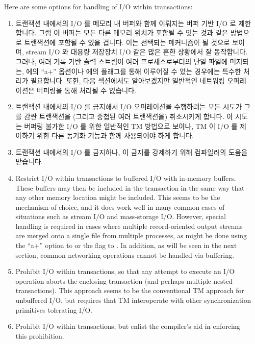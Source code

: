 Here are some options for handling of I/O within transactions:

\fi

\begin{enumerate}
\item	트랜잭션 내에서의 I/O 를 메모리 내 버퍼와 함께 이뤄지는 버퍼 기반 I/O
	로 제한합니다.
	그럼 이 버퍼는 모든 다른 메모리 위치가 포함될 수 잇는 것과 같은
	방법으로 트랜잭션에 포함될 수 있을 겁니다.
	이는 선택되는 메커니즘이 될 것으로 보이며, stream I/O 와 대용량
	저장장치 I/O 같은 많은 흔한 상황에서 잘 동작합니다.
	그러나, 여러 기록 기반 출력 스트림이 여러 프로세스로부터의 단일 파일에
	머지되는,  에의 ``a+'' 옵션이나  에의
	 플래그를 통해 이루어질 수 있는 경우에는 특수한 처리가
	필요합니다.
	또한, 다음 섹션에서도 알아보겠지만 일반적인 네트워킹 오퍼레이션은
	버퍼링을 통해 처리될 수 없습니다.
\item	트랜잭션 내에서의 I/O 를 금지해서 I/O 오퍼레이션을 수행하려는 모든
	시도가 그를 감싼 트랜잭션을 (그리고 중첩된 여러 트랜잭션을) 취소시키게
	합니다.
	이 시도는 버퍼링 불가한 I/O 를 위한 일반적인 TM 방법으로 보이나, TM 이
	I/O 를 제어하기 위한 다른 동기화 기능과 함께 사용되어야 하게
	합니다.
\item	트랜잭션 내에서의 I/O 를 금지하나, 이 금지를 강제하기 위해 컴파일러의
	도움을 받습니다.

\iffalse

\item	Restrict I/O within transactions to buffered I/O with in-memory
	buffers.
	These buffers may then be included in the transaction in the
	same way that any other memory location might be included.
	This seems to be the mechanism of choice, and it does work
	well in many common cases of situations such as stream I/O and
	mass-storage I/O\@.
	However, special handling is required in cases where multiple
	record-oriented output streams are merged onto a single file
	from multiple processes, as might be done using the ``a+''
	option to  or the  flag to .
	In addition, as will be seen in the next section, common
	networking operations cannot be handled via buffering.
\item	Prohibit I/O within transactions, so that any attempt to execute
	an I/O operation aborts the enclosing transaction (and perhaps
	multiple nested transactions).
	This approach seems to be the conventional TM approach for
	unbuffered I/O, but requires that TM interoperate with other
	synchronization primitives tolerating I/O.
\item	Prohibit I/O within transactions, but enlist the compiler's aid
	in enforcing this prohibition.


\end{enumerate}

